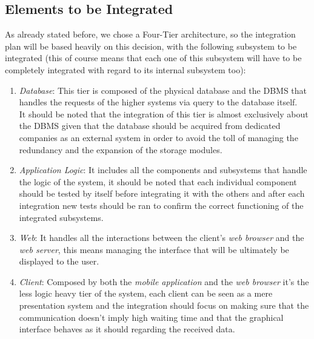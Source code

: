 \subsection{Elements to be Integrated}
As already stated before, we chose a Four-Tier architecture, so the integration plan will be based heavily on this decision, with the following subsystem to be integrated (this of course means that each one of this subsystem will have to be completely integrated with regard to its internal subsystem too):
\begin{enumerate}[label=\textbf{Tier \arabic*}]
\item \emph{Database}: This tier is composed of the physical database and the DBMS that handles the requests of the higher systems via query to the database itself.\\
It should be noted that the integration of this tier is almost exclusively about the DBMS given that the database should be acquired from dedicated companies as an external system in order to avoid the toll of managing the redundancy and the expansion of the storage modules.
\item \emph{Application Logic}: It includes all the components and subsystems that handle the logic of the system, it should be noted that each individual component should be tested by itself before integrating it with the others and after each integration new tests should be ran to confirm the correct functioning of the integrated subsystems.
\item \emph{Web}: It handles all the interactions between the client's \emph{web browser} and the \emph{web server}, this means managing the interface that will be ultimately be displayed to the user.
\item \emph{Client}: Composed by both the \emph{mobile application} and the \emph{web browser} it's the less logic heavy tier of the system, each client can be seen as a mere presentation system and the integration should focus on making sure that the communication doesn't imply high waiting time and that the graphical interface behaves as it should regarding the received data.
\end{enumerate}
